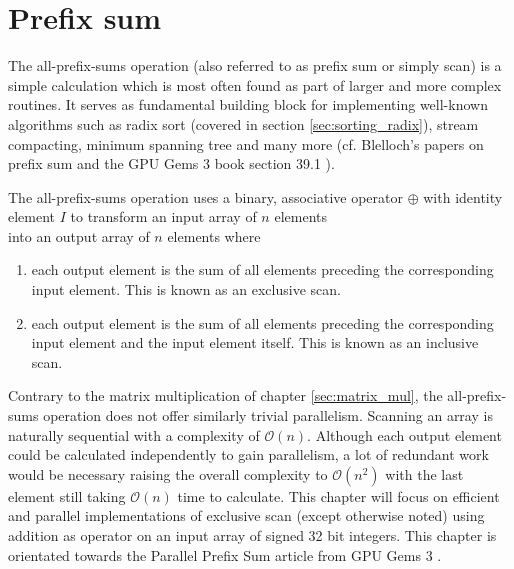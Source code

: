 \chapter{Prefix sum}
\label{sec:prefix_sum}

The all-prefix-sums operation (also referred to as prefix sum or simply scan) is a simple calculation which is most often found as part of larger and more complex routines. It serves as fundamental building block for implementing well-known algorithms such as radix sort (covered in section \ref{sec:sorting_radix}), stream compacting, minimum spanning tree and many more (cf. Blelloch's papers on prefix sum \cite{scan_blelloch_examples} \cite{scan_blelloch} and the GPU Gems 3 book section 39.1 \cite{gpu_gems_3_chapter_39}).

The all-prefix-sums operation uses a binary, associative operator $\oplus$ with identity element $I$ to transform an input array of $n$ elements
\begin{equation*}
[a_0, a_1, \dots, a_{n-1}]
\end{equation*}
into an output array of $n$ elements where

\begin{enumerate}[label=\alph*)]
	\item 
	each output element is the sum of all elements preceding the corresponding input element. This is known as an exclusive scan. \cite{gpu_gems_3_chapter_39}
	\begin{equation*}
	[I, a_0, (a_0 \oplus a_1), \dots, (a_0 \oplus a_1 \oplus \dots \oplus a_{n-2})]
	\end{equation*}
	
	\item
	each  output element is the sum of all elements preceding the corresponding input element and the input element itself. This is known as an inclusive scan. \cite{gpu_gems_3_chapter_39}
	\begin{equation*}
	[a_0, (a_0 \oplus a_1), \dots, (a_0 \oplus a_1 \oplus \dots \oplus a_{n-1})]
	\end{equation*}
\end{enumerate}

Contrary to the matrix multiplication of chapter \ref{sec:matrix_mul}, the all-prefix-sums operation does not offer similarly trivial parallelism. Scanning an array is naturally sequential with a complexity of $\mathcal{O}(n)$. Although each output element could be calculated independently to gain parallelism, a lot of redundant work would be necessary raising the overall complexity to $\mathcal{O}(n^2)$ with the last element still taking $\mathcal{O}(n)$ time to calculate.
This chapter will focus on efficient and parallel implementations of exclusive scan (except otherwise noted) using addition as operator on an input array of signed 32 bit integers. This chapter is orientated towards the Parallel Prefix Sum article from GPU Gems 3 \cite{gpu_gems_3_chapter_39}.


